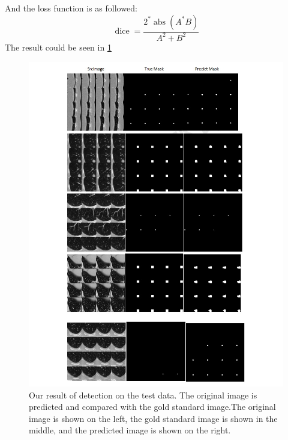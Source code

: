 \documentclass[conference]{IEEEtran}
\begin{document}
\begin{CJK}{UTF8}{gbsn}
And the loss function is as followed:
\begin{equation}\operatorname{dice}=\frac{2^{*} \operatorname{abs}\left(A^{*} B\right)}{A^{2}+B^{2}}\end{equation}
The result could be seen in \ref{fig3}
\begin{figure}[htbp]
    \centerline{\includegraphics[scale=0.5]{segImage.jpg}}
    \caption{Our result of detection on the test data. The original image is predicted and compared with the gold standard image.The original image is shown on the left, the gold standard image is shown in the middle, and the predicted image is shown on the right.}
    \label{fig3}
    \end{figure}

\end{CJK}
\end{document}
